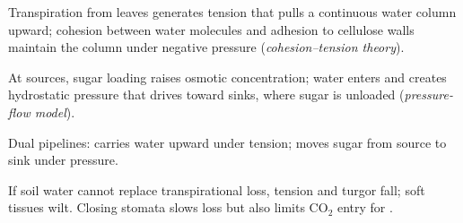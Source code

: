 \begin{proposition}
\label{prop:g12:plant-biology:cohesion}
Transpiration from leaves generates tension that pulls a continuous
water column upward; cohesion between water molecules and adhesion to
cellulose walls maintain the column under negative pressure
(\emph{cohesion--tension theory}).
\end{proposition}
\admitted

\begin{proposition}
\label{prop:g12:plant-biology:pressure-flow}
At sources, sugar loading raises osmotic concentration; water enters and
creates hydrostatic pressure that drives  toward sinks, where
sugar is unloaded (\emph{pressure-flow model}).
\end{proposition}
\admitted

\begin{omfigure}

{\small Dual pipelines:  carries water upward under tension; 
moves sugar from source to sink under pressure.}
\end{omfigure}

\begin{example}[Wilting]\label{ex:g12:plant-biology:wilt}
If soil water cannot replace transpirational loss,  tension and
 turgor fall; soft tissues wilt. Closing stomata slows loss but also
limits CO$_2$ entry for .
\end{example}

